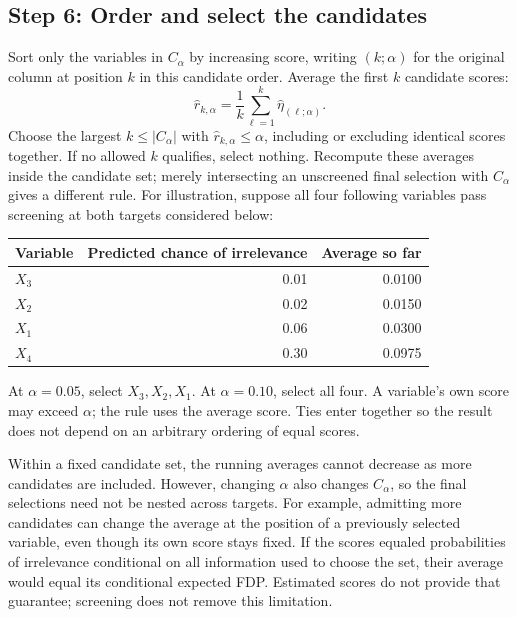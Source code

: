 \documentclass[10pt,letterpaper]{article}
\begin{document}
\subsection{Step 6: Order and select the candidates}\label{sec:selection}
Sort only the variables in $C_\alpha$ by increasing score, writing
$(k;\alpha)$ for the original column at position $k$ in this candidate order.
Average the first $k$ candidate scores:
\begin{equation}\label{eq:average}
 \widehat r_{k,\alpha}=\frac{1}{k}\sum_{\ell=1}^k\widehat\eta_{(\ell;\alpha)}.
\end{equation}
Choose the largest $k\le|C_\alpha|$ with $\widehat r_{k,\alpha}\le\alpha$,
including or excluding identical scores together. If no allowed $k$ qualifies,
select nothing. Recompute these averages inside the candidate set; merely
intersecting an unscreened final selection with $C_\alpha$ gives a different rule.
For illustration, suppose all four following variables pass screening at
both targets considered below:
\begin{center}\small
\begin{tabular}{lrr}
\toprule
Variable & Predicted chance of irrelevance & Average so far\\
\midrule
$X_3$ & 0.01 & 0.0100\\
$X_2$ & 0.02 & 0.0150\\
$X_1$ & 0.06 & 0.0300\\
$X_4$ & 0.30 & 0.0975\\
\bottomrule
\end{tabular}
\end{center}
At $\alpha=0.05$, select $X_3,X_2,X_1$. At $\alpha=0.10$, select
all four. A variable's own score may exceed $\alpha$; the rule uses
the average score. Ties enter together so the result does not depend
on an arbitrary ordering of equal scores.

Within a fixed candidate set, the running averages cannot decrease as
more candidates are included. However, changing $\alpha$ also changes
$C_\alpha$, so the final selections need not be nested across targets.
For example, admitting more candidates can change the average at the
position of a previously selected variable, even though its own score stays fixed.
If the scores equaled probabilities of irrelevance conditional on all
information used to choose the set, their average would equal its conditional
expected FDP. Estimated scores do not provide that guarantee; screening
does not remove this limitation.
\end{document}
